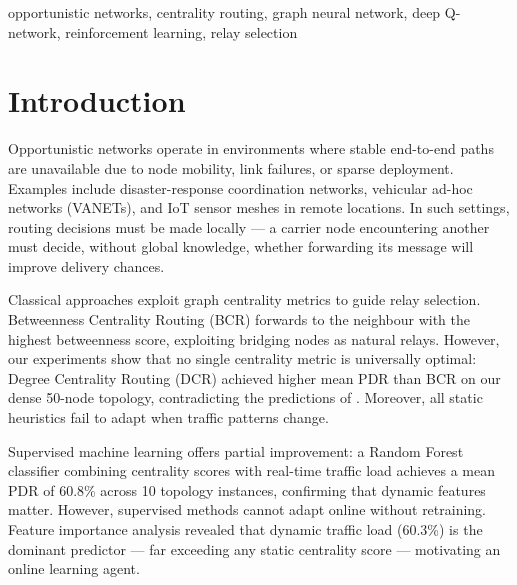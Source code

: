 \documentclass[conference]{IEEEtran}
\begin{document}
\begin{IEEEkeywords}
opportunistic networks, centrality routing, graph neural network,
deep Q-network, reinforcement learning, relay selection
\end{IEEEkeywords}

\section{Introduction}

Opportunistic networks operate in environments where stable
end-to-end paths are unavailable due to node mobility, link
failures, or sparse deployment. Examples include disaster-response
coordination networks, vehicular ad-hoc networks (VANETs), and IoT
sensor meshes in remote locations. In such settings, routing
decisions must be made locally — a carrier node encountering
another must decide, without global knowledge, whether forwarding
its message will improve delivery chances.

Classical approaches exploit graph centrality metrics to guide
relay selection. Betweenness Centrality Routing (BCR)
\cite{wan2021} forwards to the neighbour with the highest
betweenness score, exploiting bridging nodes as natural relays.
However, our experiments show that no single centrality metric is
universally optimal: Degree Centrality Routing (DCR) achieved
higher mean PDR than BCR on our dense 50-node topology,
contradicting the predictions of \cite{wan2021}. Moreover, all
static heuristics fail to adapt when traffic patterns change.

Supervised machine learning offers partial improvement: a Random
Forest classifier combining centrality scores with real-time
traffic load achieves a mean PDR of 60.8\% across 10 topology
instances, confirming that dynamic features matter. However,
supervised methods cannot adapt online without retraining. Feature
importance analysis revealed that dynamic traffic load (60.3\%) is
the dominant predictor — far exceeding any static centrality score
— motivating an online learning agent.
\end{document}
